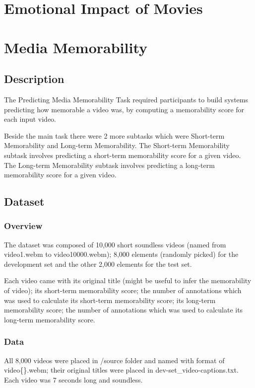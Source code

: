 {\section{Emotional Impact of Movies}\cite{emotion18}

\section{Media Memorability}
\subsection{Description}
The Predicting Media Memorability Task\cite{memo18} required participants to
build systems predicting how memorable a video was, by computing a memorability score for each input video.

Beside the main task there were 2 more subtasks which were Short-term Memorability and Long-term Memorability\cite{longtermmem}. The Short-term Memorability subtask involves predicting a short-term memorability score for a given video. The Long-term Memorability subtask involves predicting a long-term memorability score for a given video.

\subsection{Dataset}
\subsubsection{Overview}
The dataset was composed of 10,000 short soundless videos (named from video1.webm to video10000.webm); 8,000 elements (randomly picked) for the development set and the other 2,000 elements for the test set.

Each video came with its original title (might be useful to infer the memorability of video); its short-term memorability score; the number of annotations which was used to calculate its short-term memorability score; its long-term memorability score; the number of annotations which was used to calculate its long-term memorability score.

\subsubsection{Data}
All 8,000 videos were placed in /source folder and named with format of video\{\}.webm; their original titles were placed in dev-set\_video-captions.txt. Each video was 7 seconds long and soundless.

}
